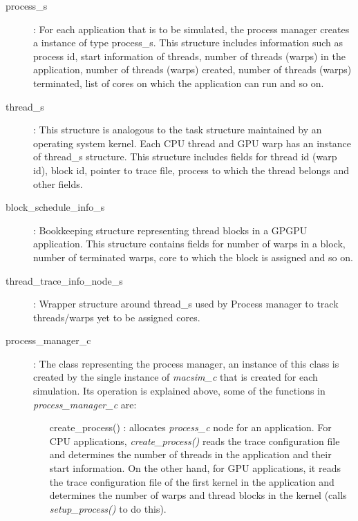 \begin{description}

  \item [process\_s]: For each application that is to be simulated, the process manager
	creates a instance of type process\_s. This structure includes information such
	as process id, start information of threads, number of threads (warps) in
	the application, number of threads (warps) created, number of threads (warps)
	terminated, list of cores on which the application can run and so on.

  \item [thread\_s]: This structure is analogous to the task structure maintained by
	an operating system kernel. Each CPU thread and GPU warp has an instance of
	thread\_s structure. This structure includes fields for thread id (warp id),
	block id, pointer to trace file, process to which the thread belongs and
	other fields. 

  \item [block\_schedule\_info\_s]: Bookkeeping structure representing thread blocks in
	a GPGPU application. This structure contains fields for number of warps in a
	block, number of terminated warps, core to which the block is assigned and so
	on.

  \item [thread\_trace\_info\_node\_s]: Wrapper structure around thread\_s used by
	Process manager to track threads/warps yet to be assigned cores.

  \item [process\_manager\_c]: The class representing the process manager, an
	  instance of this class is created by the single instance of \textit{macsim\_c}
	  that is created for each simulation. Its operation is explained above, some of
	  the functions in \textit{process\_manager\_c} are:
	  
	  \begin{itemize}

		\item [create\_process()]: allocates \textit{process\_c} node for an
		  application. For CPU applications, \textit{create\_process()} reads the trace
		  configuration file and determines the number of threads in the application and their
		  start information. On the other hand, for GPU applications, it reads the trace
		  configuration file of the first kernel in the application and determines the number of
		warps and thread blocks in the kernel (calls \textit{setup\_process()} to do this).


\end{itemize}
\end{description}

